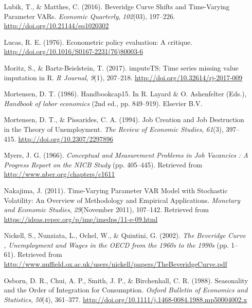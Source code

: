 \documentclass[12pt,oneside]{reedthesis}
\begin{document}
\leavevmode\hypertarget{ref-Lubik2016}{}%
Lubik, T., \& Matthes, C. (2016). Beveridge Curve Shifts and Time-Varying Parameter VARs. \emph{Economic Quarterly}, \emph{102}(03), 197--226. \url{http://doi.org/10.21144/eq1020302}

\leavevmode\hypertarget{ref-Lucas1976}{}%
Lucas, R. E. (1976). Econometric policy evaluation: A critique. \url{http://doi.org/10.1016/S0167-2231(76)80003-6}

\leavevmode\hypertarget{ref-Moritz2017}{}%
Moritz, S., \& Bartz-Beielstein, T. (2017). imputeTS: Time series missing value imputation in R. \emph{R Journal}, \emph{9}(1), 207--218. \url{http://doi.org/10.32614/rj-2017-009}

\leavevmode\hypertarget{ref-Mortensen1986}{}%
Mortensen, D. T. (1986). Handbookcap15. In R. Layard \& O. Ashenfelter (Eds.), \emph{Handbook of labor economics} (2nd ed., pp. 849--919). Elsevier B.V.

\leavevmode\hypertarget{ref-Mortensen1994}{}%
Mortensen, D. T., \& Pissarides, C. A. (1994). Job Creation and Job Destruction in the Theory of Unemployment. \emph{The Review of Economic Studies}, \emph{61}(3), 397--415. \url{http://doi.org/10.2307/2297896}

\leavevmode\hypertarget{ref-Myers1966}{}%
Myers, J. G. (1966). \emph{Conceptual and Measurement Problems in Job Vacancies : A Progress Report on the NICB Study} (pp. 405--445). Retrieved from \url{http://www.nber.org/chapters/c1611}

\leavevmode\hypertarget{ref-Nakajima2011}{}%
Nakajima, J. (2011). Time-Varying Parameter VAR Model with Stochastic Volatility: An Overview of Methodology and Empirical Applications. \emph{Monetary and Economic Studies}, \emph{29}(November 2011), 107--142. Retrieved from \url{https://ideas.repec.org/p/ime/imedps/11-e-09.html}

\leavevmode\hypertarget{ref-Nickell2002}{}%
Nickell, S., Nunziata, L., Ochel, W., \& Quintini, G. (2002). \emph{The Beveridge Curve , Unemployment and Wages in the OECD from the 1960s to the 1990s} (pp. 1--61). Retrieved from \url{http://www.nuffield.ox.ac.uk/users/nickell/papers/TheBeveridgeCurve.pdf}

\leavevmode\hypertarget{ref-Osborn1988}{}%
Osborn, D. R., Chui, A. P., Smith, J. P., \& Birchenhall, C. R. (1988). Seasonality and the Order of Integration for Consumption. \emph{Oxford Bulletin of Economics and Statistics}, \emph{50}(4), 361--377. \url{http://doi.org/10.1111/j.1468-0084.1988.mp50004002.x}
\end{document}
